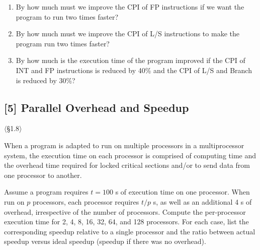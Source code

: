 \begin{enumerate}
  \item[1.15.1] [10] By how much must we improve the CPI of FP instructions if we
        want the program to run two times faster?
  \item[1.15.2] [10] By how much must we improve the CPI of L/S instructions to
        make the program run two times faster?
  \item[1.15.3] [5] By how much is the execution time of the program improved if
        the CPI of INT and FP instructions is reduced by 40\% and the CPI of
        L/S and Branch is reduced by 30\%?
\end{enumerate}

\problembreak %

\subsection{[5] Parallel Overhead and Speedup}
\hypertarget{prob-1.16}{}
\noindent$\langle$\S1.8$\rangle$\medskip

\noindent When a program is adapted to run on multiple processors in a multiprocessor
system, the execution time on each processor is comprised of computing time
and the overhead time required for locked critical sections and/or to send
data from one processor to another.

Assume a program requires $t = 100$ s of execution time on one processor.
When run on $p$ processors, each processor requires $t/p$ s, as well as an
additional 4 s of overhead, irrespective of the number of processors. Compute
the per-processor execution time for 2, 4, 8, 16, 32, 64, and 128
processors. For each case, list the corresponding speedup relative to a single
processor and the ratio between actual speedup versus ideal speedup (speedup
if there was no overhead).
